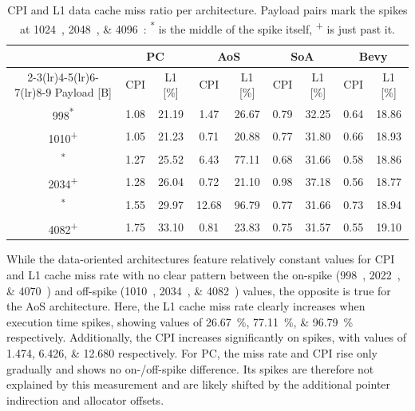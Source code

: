 \begin{table}[htbp]
  \centering
  \setlength{\tabcolsep}{5pt}
  \begin{tabular}{c cc cc cc cc}
    \toprule
    & \multicolumn{2}{c}{\acs{PC}} & \multicolumn{2}{c}{\acs{AoS}} & \multicolumn{2}{c}{\acs{SoA}} & \multicolumn{2}{c}{Bevy} \\
    \cmidrule(lr){2-3}\cmidrule(lr){4-5}\cmidrule(lr){6-7}\cmidrule(lr){8-9}
    {Payload [B]} & {CPI} & {L1 [\unit{\percent}]} & {CPI} & {L1 [\unit{\percent}]} & {CPI} & {L1 [\unit{\percent}]} & {CPI} & {L1 [\unit{\percent}]} \\
    \midrule
    998\textsuperscript{*}  & 1.08 & 21.19 &  1.47 & 26.67 & 0.79 & 32.25 & 0.64 & 18.86 \\
    1010\textsuperscript{+} & 1.05 & 21.23 &  0.71 & 20.88 & 0.77 & 31.80 & 0.66 & 18.93 \\
    \addlinespace
    2022\textsuperscript{*} & 1.27 & 25.52 &  6.43 & 77.11 & 0.68 & 31.66 & 0.58 & 18.86 \\
    2034\textsuperscript{+} & 1.28 & 26.04 &  0.72 & 21.10 & 0.98 & 37.18 & 0.56 & 18.77 \\
    \addlinespace
    4070\textsuperscript{*} & 1.55 & 29.97 & 12.68 & 96.79 & 0.77 & 31.66 & 0.73 & 18.94 \\
    4082\textsuperscript{+} & 1.75 & 33.10 &  0.81 & 23.83 & 0.75 & 31.57 & 0.55 & 19.10 \\
    \bottomrule
  \end{tabular}
  \vspace{\medskipamount}
    \caption{CPI and L1 data cache miss ratio per architecture. Payload pairs mark the spikes at \qtylist{1024;2048;4096}{\byte}: \textsuperscript{*} is the middle of the spike itself, \textsuperscript{+} is just past it.}
  \label{tab:s2:cache}
\end{table}

While the data-oriented architectures feature relatively constant values for \ac{CPI} and L1 cache miss rate with no clear pattern between the on-spike (\qtylist{998;2022;4070}{\byte}) and off-spike (\qtylist{1010;2034;4082}{\byte}) values, the opposite is true for the \ac{AoS} architecture. Here, the L1 cache miss rate clearly increases when execution time spikes, showing values of \qtylist{26.67;77.11;96.79}{\percent} respectively. Additionally, the \ac{CPI} increases significantly on spikes, with values of \numlist{1.474;6.426;12.680} respectively. For \ac{PC}, the miss rate and \ac{CPI} rise only gradually and shows no \mbox{on-/off-spike} difference. Its spikes are therefore not explained by this measurement and are likely shifted by the additional pointer indirection and allocator offsets.

